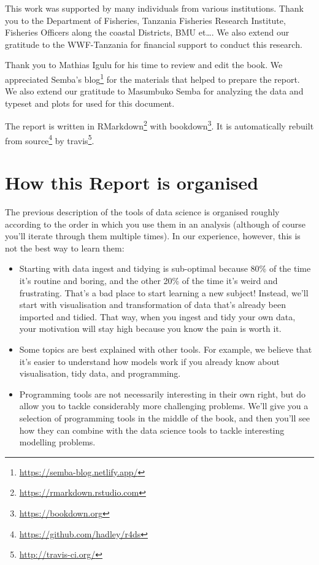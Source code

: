 \documentclass[
  12pt,
  a4paper,
  oneside]{book}
\DeclareRobustCommand{\href}[2]{#2\footnote{\url{#1}}}
\begin{document}
This work was supported by many individuals from various institutions. Thank you to the Department of Fisheries, Tanzania Fisheries Research Institute, Fisheries Officers along the coastal Districts, BMU et\ldots. We also extend our gratitude to the WWF-Tanzania for financial support to conduct this research.

Thank you to Mathias Igulu for his time to review and edit the book. We appreciated \href{https://semba-blog.netlify.app/}{Semba's blog} for the materials that helped to prepare the report. We also extend our gratitude to Masumbuko Semba for analyzing the data and typeset and plots for used for this document.

The report is written in \href{https://rmarkdown.rstudio.com}{RMarkdown} with \href{https://bookdown.org}{bookdown}. It is automatically rebuilt from \href{https://github.com/hadley/r4ds}{source} by \href{http://travis-ci.org/}{travis}.

\newpage

\hypertarget{how-this-report-is-organised}{%
\section*{How this Report is organised}\label{how-this-report-is-organised}}

The previous description of the tools of data science is organised roughly according to the order in which you use them in an analysis (although of course you'll iterate through them multiple times). In our experience, however, this is not the best way to learn them:

\begin{itemize}
\item
  Starting with data ingest and tidying is sub-optimal because 80\% of the time
  it's routine and boring, and the other 20\% of the time it's weird and
  frustrating. That's a bad place to start learning a new subject! Instead,
  we'll start with visualisation and transformation of data that's already been
  imported and tidied. That way, when you ingest and tidy your own data, your
  motivation will stay high because you know the pain is worth it.
\item
  Some topics are best explained with other tools. For example, we believe that
  it's easier to understand how models work if you already know about
  visualisation, tidy data, and programming.
\item
  Programming tools are not necessarily interesting in their own right,
  but do allow you to tackle considerably more challenging problems. We'll
  give you a selection of programming tools in the middle of the book, and
  then you'll see how they can combine with the data science tools to tackle
  interesting modelling problems.
\end{itemize}
\end{document}
